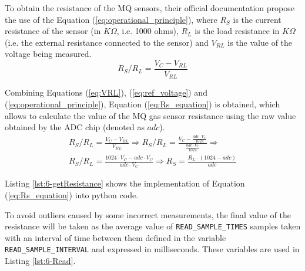 To obtain the resistance of the MQ sensors, their official documentation \cite{MQ7,MQ2} propose the use of the Equation (\ref{eq:operational_principle}), where ${R}_{S}$ is the current resistance of the sensor (in $K\Omega$, i.e. 1000 ohms), ${R}_{L}$ is the load resistance in $K\Omega$ (i.e. the external resistance connected to the sensor) and ${V}_{RL}$ is the value of the voltage being measured. 
\begin{equation} \label{eq:operational_principle}
{ { R }_{ S } }/{ { R }_{ L } }=\frac { { V }_{ C }-V_{ RL } }{ V_{ RL } } 
\end{equation}

Combining Equations (\ref{eq:VRL}), (\ref{eq:ref_voltage}) and (\ref{eq:operational_principle}), Equation (\ref{eq:Rs_equation}) is obtained, which allows to calculate the value of the MQ gas sensor resistance using the raw value obtained by the \ac{ADC} chip (denoted as $adc$).
\begin{equation} \label{eq:Rs_equation}
\begin{aligned}
{ { R }_{ S } }/{ { R }_{ L } }=\frac { { V }_{ C }-V_{ RL } }{ V_{ RL } } \Rightarrow 
{ { R }_{ S } }/{ { R }_{ L } }=\frac { { V }_{ C }-\frac { adc\cdot { V }_{ C } }{ 1024 }  }{ \frac { adc\cdot { V }_{ C } }{ 1024 }  } \Rightarrow \\
{ { R }_{ S } }/{ { R }_{ L } }=\frac { 1024\cdot { V }_{ C }-adc\cdot { V }_{ C } }{ adc\cdot { V }_{ C } } \Rightarrow 
\boxed{
{ R }_{ S }=\frac {  { R }_{ L } \cdot (1024-adc) }{ adc } 
}
\end{aligned}
\end{equation}

Listing \ref{lst:6-getResistance} shows the implementation of Equation (\ref{eq:Rs_equation}) into python code.


To avoid outliers caused by some incorrect measurements, the final value of the resistance will be taken as the average value of \texttt{READ\_SAMPLE\_TIMES} samples taken with an interval of time between them defined in the variable \texttt{READ\_SAMPLE\_INTERVAL} and expressed in milliseconds. These variables are used in Listing \ref{lst:6-Read}.


